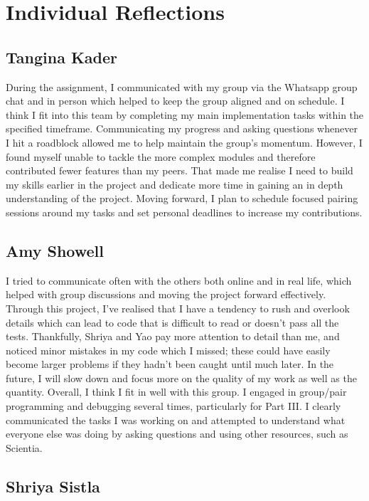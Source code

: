 \documentclass[11pt]{article}
\begin{document}
\section{Individual Reflections}

\subsection{Tangina Kader}

During the assignment, I communicated with my group via the Whatsapp group chat and in person which 
helped to keep the group aligned and on schedule. I think I fit into this team by completing my main 
implementation tasks within the specified timeframe. Communicating my progress and asking questions 
whenever I hit a roadblock allowed me to help maintain the group’s momentum. However, I found myself 
unable to tackle the more complex modules and therefore contributed fewer features than my peers. That 
made me realise I need to build my skills earlier in the project and dedicate more time in gaining an in 
depth understanding of the project. Moving forward, I plan to schedule focused pairing sessions around my 
tasks and set personal deadlines to increase my contributions.

\subsection{Amy Showell}

I tried to communicate often with the others both online and in real life, which helped with group
discussions and moving the project forward effectively. Through this project, I’ve realised that I
have a tendency to rush and overlook details which can lead to code that is difficult to read or
doesn’t pass all the tests. Thankfully, Shriya and Yao pay more attention to detail than me, and
noticed minor mistakes in my code which I missed; these could have easily become larger problems
if they hadn’t been caught until much later. In the future, I will slow down and focus more on
the quality of my work as well as the quantity. Overall, I think I fit in well with this group. I
engaged in group/pair programming and debugging several times, particularly for Part III. I clearly
communicated the tasks I was working on and attempted to understand what everyone else was
doing by asking questions and using other resources, such as Scientia.

\subsection{Shriya Sistla}
\end{document}
